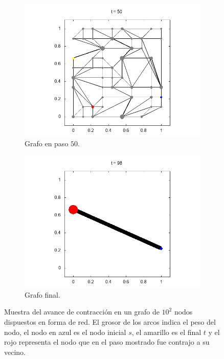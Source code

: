 \documentclass{article}
\begin{document}
\begin{figure}[h]
    \begin{subfigure}[b]{0.45\textwidth}
      \includegraphics[width=\textwidth]{t050}
      \caption{Grafo en paso $50$.}
      \label{fig:c}
    \end{subfigure}
    \begin{subfigure}[b]{0.45\textwidth}
      \includegraphics[width=\textwidth]{t098}
      \caption{Grafo final.}
          \label{fig:d}
    \end{subfigure}
    \caption{Muestra del avance de contracción en un grafo de $10^2$ nodos dispuestos en forma de red. El grosor de los arcos indica el peso del nodo, el nodo en azul es el nodo inicial $s$, el amarillo es el final $t$ y el rojo representa el nodo que en el paso mostrado fue contrajo a su vecino.}\label{ejemplosGrafos}
\end{figure}
\end{document}
